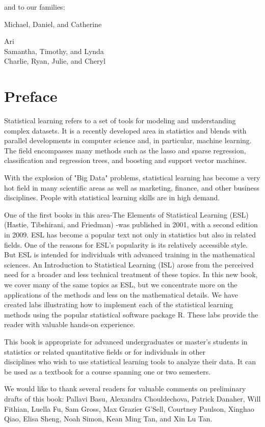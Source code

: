 \documentclass[10pt]{article}
\begin{document}
and to our families:

Michael, Daniel, and Catherine

Ari\\
Samantha, Timothy, and Lynda\\
Charlie, Ryan, Julie, and Cheryl

\section*{Preface}
Statistical learning refers to a set of tools for modeling and understanding complex datasets. It is a recently developed area in statistics and blends with parallel developments in computer science and, in particular, machine learning. The field encompasses many methods such as the lasso and sparse regression, classification and regression trees, and boosting and support vector machines.

With the explosion of "Big Data" problems, statistical learning has become a very hot field in many scientific areas as well as marketing, finance, and other business disciplines. People with statistical learning skills are in high demand.

One of the first books in this area-The Elements of Statistical Learning (ESL) (Hastie, Tibshirani, and Friedman) -was published in 2001, with a second edition in 2009. ESL has become a popular text not only in statistics but also in related fields. One of the reasons for ESL's popularity is its relatively accessible style. But ESL is intended for individuals with advanced training in the mathematical sciences. An Introduction to Statistical Learning (ISL) arose from the perceived need for a broader and less technical treatment of these topics. In this new book, we cover many of the same topics as ESL, but we concentrate more on the applications of the methods and less on the mathematical details. We have created labs illustrating how to implement each of the statistical learning methods using the popular statistical software package R. These labs provide the reader with valuable hands-on experience.

This book is appropriate for advanced undergraduates or master's students in statistics or related quantitative fields or for individuals in other\\
disciplines who wish to use statistical learning tools to analyze their data. It can be used as a textbook for a course spanning one or two semesters.

We would like to thank several readers for valuable comments on preliminary drafts of this book: Pallavi Basu, Alexandra Chouldechova, Patrick Danaher, Will Fithian, Luella Fu, Sam Gross, Max Grazier G'Sell, Courtney Paulson, Xinghao Qiao, Elisa Sheng, Noah Simon, Kean Ming Tan, and Xin Lu Tan.
\end{document}
